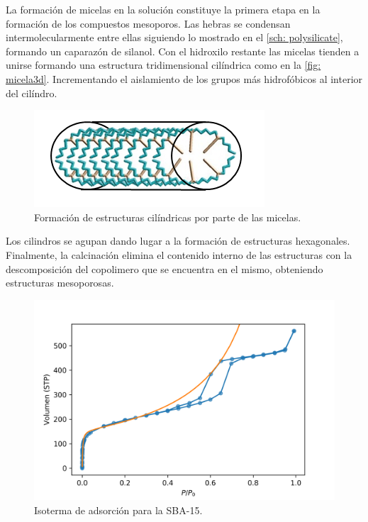 \documentclass[fleqn,11pt]{SelfArx}
\begin{document}
	La formaci\'on de micelas en la soluci\'on constituye la primera etapa en la formaci\'on de los compuestos mesoporos. Las hebras se condensan intermolecularmente entre ellas siguiendo lo mostrado en el \autoref{sch: polysilicate}, formando un caparaz\'on de silanol. Con el hidroxilo restante las micelas tienden a unirse formando una estructura tridimensional cil\'indrica como en la \autoref{fig: micela3d}. Incrementando el aislamiento de los grupos m\'as hidrof\'obicos al interior del cil\'indro.
	\begin{figure}[h]
		\centering
		\includegraphics[width=0.8\linewidth]{structures/micela3D.png}
		\caption{Formaci\'on de estructuras cil\'indricas por parte de las micelas.}
		\label{fig: micela3d}
	\end{figure}
	
	Los cilindros se agupan dando lugar a la formaci\'on de estructuras hexagonales. Finalmente, la calcinaci\'on elimina el contenido interno de las estructuras con la descomposici\'on del copolimero que se encuentra en el mismo, obteniendo estructuras mesoporosas.
	
	\begin{figure}[h]
		\centering
		\includegraphics[width=\linewidth]{isoterma}
		\caption{Isoterma de adsorci\'on para la SBA-15.}
		\label{fig: isoterma}
	\end{figure}
	
\end{document}
